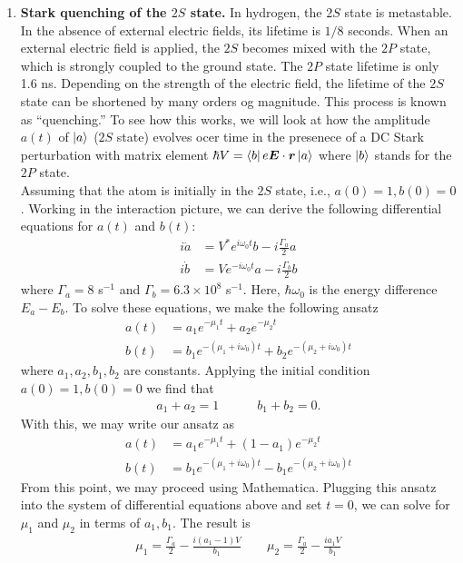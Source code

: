 \documentclass{article}
\theoremstyle{definition}
\newcommand{\f}[2]{\frac{#1}{#2}}
\begin{document}
\begin{enumerate}[label=(\alph*)]
	\item \textbf{Stark quenching of the $2S$ state.} In hydrogen, the $2S$ state is metastable. In the absence of external electric fields, its lifetime is $1/8$ seconds. When an external electric field is applied, the $2S$ becomes mixed with the $2P$ state, which is strongly coupled to the ground state. The $2P$ state lifetime is only 1.6 ns. Depending on the strength of the electric field, the lifetime of the $2S$ state can be shortened by many orders og magnitude. This process is known as ``quenching.'' To see how this works, we will look at how the amplitude $a(t)$ of $\ket{a} $ ($2S$ state) evolves ocer time in the presenece of a DC Stark perturbation with matrix element $\hbar V  =\bra{b} e\bm{E}\cdot \bm{r} \ket{a}$ where $\ket{b}$ stands for the $2P$ state.\\
	
	
	Assuming that the atom is initially in the $2S$ state, i.e., $a(0) = 1, b(0) = 0$. Working in the interaction picture, we can derive the following differential equations for $a(t)$ and $b(t)$: 
	\begin{align*}
	i\dot a &= V^* e^{i\omega_0 t} b - i \f{\Gamma_a}{2}a\\
	i\dot b &= V e^{-i\omega_0 t} a - i \f{\Gamma_b}{2}b
	\end{align*}
	where $\Gamma_a = 8$ s$^{-1}$ and $\Gamma_b = 6.3 \times 10^8$ s$^{-1}$. Here, $\hbar \omega_0$ is the energy difference $E_a - E_b$. To solve these equations, we make the following ansatz
	\begin{align*}
	a(t) &= a_1 e^{-\mu_1 t} + a_2 e^{-\mu_2 t}\\
	b(t) &= b_1 e^{-(\mu_1 + i\omega_0)t} + b_2 e^{-(\mu_2 + i\omega_0)t}
	\end{align*}
	where $a_1,a_2,b_1,b_2$ are constants. Applying the initial condition $a(0) = 1, b(0) = 0$ we find that
	\begin{align*}
	a_1 + a_2 = 1 \quad\quad \quad b_1 + b_2 =0.
	\end{align*}
	With this, we may write our ansatz as 
	\begin{align*}
	a(t) &= a_1 e^{-\mu_1 t} + (1-a_1) e^{-\mu_2 t}\\
	b(t) &= b_1 e^{-(\mu_1 + i\omega_0)t} -b_1 e^{-(\mu_2 + i\omega_0)t}
	\end{align*}
	From this point, we may proceed using Mathematica. Plugging this ansatz into the system of differential equations above and set $t=0$, we can solve for $\mu_1$ and $\mu_2$ in terms of $a_1,b_1$. The result is 
	\begin{align*}
	{\mu_1 = \f{\Gamma_a}{2} - \f{i(a_1-1)V}{b_1} \quad\quad \mu_2 = \f{\Gamma_a}{2} - \f{ia_1V}{b_1}}
	\end{align*}
	

\end{enumerate}
\end{document}
